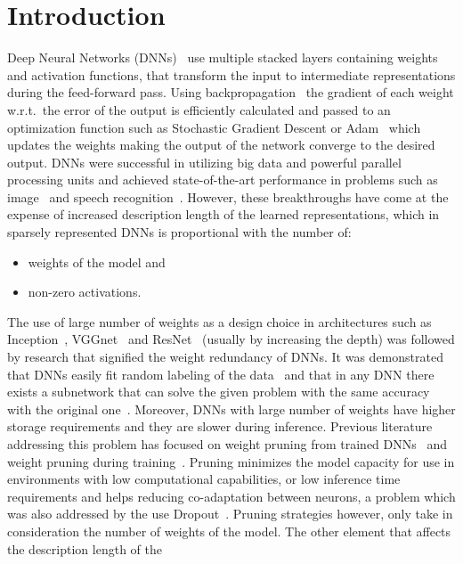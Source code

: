 \documentclass[journal]{IEEEtran}
\begin{document}
\section{Introduction}
Deep Neural Networks (DNNs)~\cite{lecun2015deep} use multiple stacked
layers containing weights and activation functions, that transform
the input to intermediate representations during the feed-forward pass.
Using backpropagation~\cite{rumelhart1986learning} the gradient of
each weight w.r.t.\ the error of the output is efficiently calculated
and passed to an optimization function such as Stochastic Gradient
Descent or Adam~\cite{kingma2014adam} which updates the weights
making the output of the network converge to the desired output.
DNNs were successful in utilizing big data and powerful parallel
processing units and achieved state-of-the-art performance in
problems such as image~\cite{krizhevsky2012imagenet} and speech
recognition~\cite{graves2013speech}.
However, these breakthroughs have come at the expense of increased
description length of the learned representations, which in sparsely
represented DNNs is proportional with the number of:
\begin{itemize}
  \item weights of the model and
  \item non-zero activations.
\end{itemize}
The use of large number of weights as a design choice in
architectures such as Inception~\cite{szegedy2016rethinking},
VGGnet~\cite{simonyan2014very} and ResNet~\cite{he2016deep} (usually
by increasing the depth) was followed by research that signified the
weight redundancy of DNNs.
It was demonstrated that DNNs easily fit random labeling of the
data~\cite{zhang2016understanding} and that in any DNN there exists a
subnetwork that can solve the given problem with the same accuracy
with the original one~\cite{frankle2018lottery}.
Moreover, DNNs with large number of weights have higher storage
requirements and they are slower during inference.
Previous literature addressing this problem has focused on weight
pruning from trained DNNs~\cite{aghasi2017net} and weight pruning
during training~\cite{lin2017runtime}.
Pruning minimizes the model capacity for use in environments with low
computational capabilities, or low inference time requirements and
helps reducing co-adaptation between neurons, a problem which was
also addressed by the use Dropout~\cite{srivastava2014dropout}.
Pruning strategies however, only take in consideration the number of
weights of the model.
The other element that affects the description length of the
\end{document}
